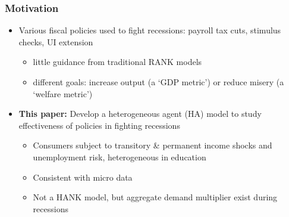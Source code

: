 \documentclass[pdflatex,aspectratio=169]{beamer}
\begin{document}
\begin{frame}
\frametitle{Motivation}
\begin{itemize} 
	\item Various fiscal policies used to fight recessions: payroll tax cuts, stimulus checks, UI extension
	\begin{itemize}
		\itemsep = .25\bigskipamount 
		\item little guidance from traditional RANK models	
		\item different goals: increase output (a `GDP metric') or reduce misery (a `welfare metric')
	\end{itemize}
	\bigskip
	\pause
	\item \textbf{This paper:} Develop a heterogeneous agent (HA) model to study effectiveness of policies in fighting recessions
	\begin{itemize}
		\itemsep = .25\bigskipamount 
		\item Consumers subject to transitory \& permanent income shocks and unemployment risk, heterogeneous in education
		\item Consistent with micro data
		\item Not a HANK model, but aggregate demand multiplier exist during recessions
	\end{itemize}
\end{itemize}
\end{frame}
\end{document}
